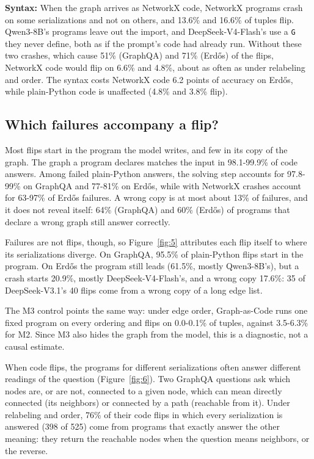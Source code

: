 \documentclass[11pt]{article}
\begin{document}
\textbf{Syntax:} When the graph arrives as NetworkX code, NetworkX programs crash on some serializations and not on others, and 13.6\% and 16.6\% of tuples flip. Qwen3-8B's programs leave out the import, and DeepSeek-V4-Flash's use a \texttt{G} they never define, both as if the prompt's code had already run. Without these two crashes, which cause 51\% (GraphQA) and 71\% (Erdős) of the flips, NetworkX code would flip on 6.6\% and 4.8\%, about as often as under relabeling and order. The syntax costs NetworkX code 6.2 points of accuracy on Erdős, while plain-Python code is unaffected (4.8\% and 3.8\% flip).

\subsection{Which failures accompany a flip?}\label{sec:localize}

Most flips start in the program the model writes, and few in its copy of the graph. The graph a program declares matches the input in 98.1-99.9\% of code answers. Among failed plain-Python answers, the solving step accounts for 97.8-99\% on GraphQA and 77-81\% on Erdős, while with NetworkX crashes account for 63-97\% of Erdős failures. A wrong copy is at most about 13\% of failures, and it does not reveal itself: 64\% (GraphQA) and 60\% (Erdős) of programs that declare a wrong graph still answer correctly.

Failures are not flips, though, so Figure~\ref{fig:5} attributes each flip itself to where its serializations diverge. On GraphQA, 95.5\% of plain-Python flips start in the program. On Erdős the program still leads (61.5\%, mostly Qwen3-8B's), but a crash starts 20.9\%, mostly DeepSeek-V4-Flash's, and a wrong copy 17.6\%: 35 of DeepSeek-V3.1's 40 flips come from a wrong copy of a long edge list.

The M3 control points the same way: under edge order, Graph-as-Code runs one fixed program on every ordering and flips on 0.0-0.1\% of tuples, against 3.5-6.3\% for M2. Since M3 also hides the graph from the model, this is a diagnostic, not a causal estimate.

When code flips, the programs for different serializations often answer different readings of the question (Figure~\ref{fig:6}). Two GraphQA questions ask which nodes are, or are not, connected to a given node, which can mean directly connected (its neighbors) or connected by a path (reachable from it). Under relabeling and order, 76\% of their code flips in which every serialization is answered (398 of 525) come from programs that exactly answer the other meaning: they return the reachable nodes when the question means neighbors, or the reverse.
\end{document}
